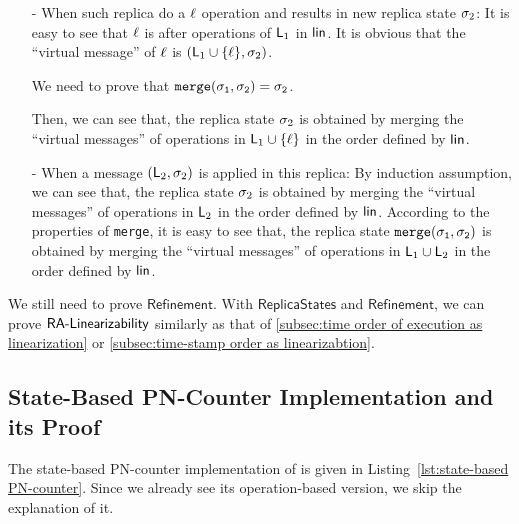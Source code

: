 \begin{itemize}
\setlength{\itemsep}{0.5pt}
\item[-] When such replica do a $\ell$ operation and results in new replica state $\sigma_2$: It is easy to see that $\ell$ is after operations of $\mathsf{L}_1$ in $\mathsf{lin}$. It is obvious that the ``virtual message'' of $\ell$ is $(\mathsf{L}_1 \cup \{ \ell \},\sigma_2)$.

    We need to prove that $\alabelshort[{\tt merge}]{\astate_1,\astate_2} = \astate_2$.

    Then, we can see that, the replica state $\sigma_2$ is obtained by merging the ``virtual messages'' of operations in $\mathsf{L}_1 \cup \{ \ell \}$ in the order defined by $\mathsf{lin}$.

\item[-] When a message $(\mathsf{L}_2,\sigma_2)$ is applied in this replica: By induction assumption, we can see that, the replica state $\sigma_2$ is obtained by merging the ``virtual messages'' of operations in $\mathsf{L}_2$ in the order defined by $\mathsf{lin}$. According to the properties of {\tt merge}, it is easy to see that, the replica state $\alabelshort[{\tt merge}]{\astate_1,\astate_2}$ is obtained by merging the ``virtual messages'' of operations in $\mathsf{L}_1 \cup \mathsf{L}_2$ in the order defined by $\mathsf{lin}$.
\end{itemize}

We still need to prove $\mathsf{Refinement}$. With $\mathsf{ReplicaStates}$ and $\mathsf{Refinement}$, we can prove $\mathsf{RA\text{-}Linearizability{}}$ similarly as that of \sectionautorefname \ref{subsec:time order of execution as linearization} or \sectionautorefname \ref{subsec:time-stamp order as linearizabtion}.







\subsection{State-Based PN-Counter Implementation and its Proof}
\label{subsec:state-based PN-counter implementation and its proof}

The state-based PN-counter implementation of \cite{ShapiroPBZ11} is given in Listing~\ref{lst:state-based PN-counter}. Since we already see its operation-based version, we skip the explanation of it.

